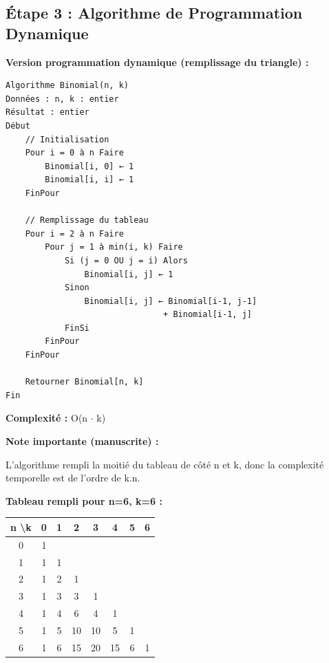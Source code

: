 \documentclass[12pt,a4paper]{article}
\begin{document}
\subsection{Étape 3 : Algorithme de Programmation Dynamique}

\begin{algorithme}
\textbf{Version programmation dynamique (remplissage du triangle) :}
\begin{verbatim}
Algorithme Binomial(n, k)
Données : n, k : entier
Résultat : entier
Début
    // Initialisation
    Pour i = 0 à n Faire
        Binomial[i, 0] ← 1
        Binomial[i, i] ← 1
    FinPour
    
    // Remplissage du tableau
    Pour i = 2 à n Faire
        Pour j = 1 à min(i, k) Faire
            Si (j = 0 OU j = i) Alors
                Binomial[i, j] ← 1
            Sinon
                Binomial[i, j] ← Binomial[i-1, j-1] 
                                + Binomial[i-1, j]
            FinSi
        FinPour
    FinPour
    
    Retourner Binomial[n, k]
Fin
\end{verbatim}

\textbf{Complexité :} O(n $\cdot$ k)
\end{algorithme}

\begin{notecours}
\textbf{Note importante (manuscrite) :}

L'algorithme rempli la moitié du tableau de côté n et k, donc la complexité temporelle est de l'ordre de k.n.
\end{notecours}

\begin{exemple}
\textbf{Tableau rempli pour n=6, k=6 :}

\begin{center}
\begin{tabular}{c|ccccccc}
n \textbackslash k & 0 & 1 & 2 & 3 & 4 & 5 & 6 \\
\hline
0 & 1 & & & & & & \\
1 & 1 & 1 & & & & & \\
2 & 1 & 2 & 1 & & & & \\
3 & 1 & 3 & 3 & 1 & & & \\
4 & 1 & 4 & 6 & 4 & 1 & & \\
5 & 1 & 5 & 10 & 10 & 5 & 1 & \\
6 & 1 & 6 & 15 & 20 & 15 & 6 & 1 \\
\end{tabular}
\end{center}
\end{exemple}
\end{document}
